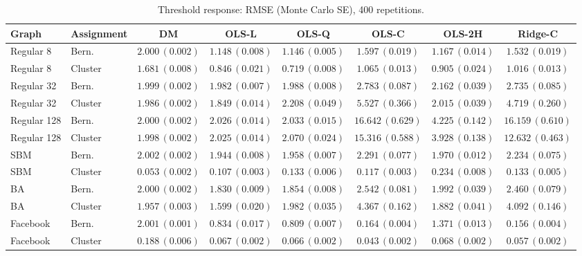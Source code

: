 \begin{table}[t]
\centering\scriptsize
\caption{Threshold response: RMSE (Monte Carlo SE), 400 repetitions.}
\begin{tabular}{llcccccc}
\toprule
Graph & Assignment & DM & OLS-L & OLS-Q & OLS-C & OLS-2H & Ridge-C \\
\midrule
Regular 8 & Bern. & $2.000\,(0.002)$ & $1.148\,(0.008)$ & $1.146\,(0.005)$ & $1.597\,(0.019)$ & $1.167\,(0.014)$ & $1.532\,(0.019)$ \\
Regular 8 & Cluster & $1.681\,(0.008)$ & $0.846\,(0.021)$ & $0.719\,(0.008)$ & $1.065\,(0.013)$ & $0.905\,(0.024)$ & $1.016\,(0.013)$ \\
Regular 32 & Bern. & $1.999\,(0.002)$ & $1.982\,(0.007)$ & $1.988\,(0.008)$ & $2.783\,(0.087)$ & $2.162\,(0.039)$ & $2.735\,(0.085)$ \\
Regular 32 & Cluster & $1.986\,(0.002)$ & $1.849\,(0.014)$ & $2.208\,(0.049)$ & $5.527\,(0.366)$ & $2.015\,(0.039)$ & $4.719\,(0.260)$ \\
Regular 128 & Bern. & $2.000\,(0.002)$ & $2.026\,(0.014)$ & $2.033\,(0.015)$ & $16.642\,(0.629)$ & $4.225\,(0.142)$ & $16.159\,(0.610)$ \\
Regular 128 & Cluster & $1.998\,(0.002)$ & $2.025\,(0.014)$ & $2.070\,(0.024)$ & $15.316\,(0.588)$ & $3.928\,(0.138)$ & $12.632\,(0.463)$ \\
SBM & Bern. & $2.002\,(0.002)$ & $1.944\,(0.008)$ & $1.958\,(0.007)$ & $2.291\,(0.077)$ & $1.970\,(0.012)$ & $2.234\,(0.075)$ \\
SBM & Cluster & $0.053\,(0.002)$ & $0.107\,(0.003)$ & $0.133\,(0.006)$ & $0.117\,(0.003)$ & $0.234\,(0.008)$ & $0.133\,(0.005)$ \\
BA & Bern. & $2.000\,(0.002)$ & $1.830\,(0.009)$ & $1.854\,(0.008)$ & $2.542\,(0.081)$ & $1.992\,(0.039)$ & $2.460\,(0.079)$ \\
BA & Cluster & $1.957\,(0.003)$ & $1.599\,(0.020)$ & $1.982\,(0.035)$ & $4.367\,(0.162)$ & $1.882\,(0.041)$ & $4.092\,(0.146)$ \\
Facebook & Bern. & $2.001\,(0.001)$ & $0.834\,(0.017)$ & $0.809\,(0.007)$ & $0.164\,(0.004)$ & $1.371\,(0.013)$ & $0.156\,(0.004)$ \\
Facebook & Cluster & $0.188\,(0.006)$ & $0.067\,(0.002)$ & $0.066\,(0.002)$ & $0.043\,(0.002)$ & $0.068\,(0.002)$ & $0.057\,(0.002)$ \\
\bottomrule
\end{tabular}
\end{table}

